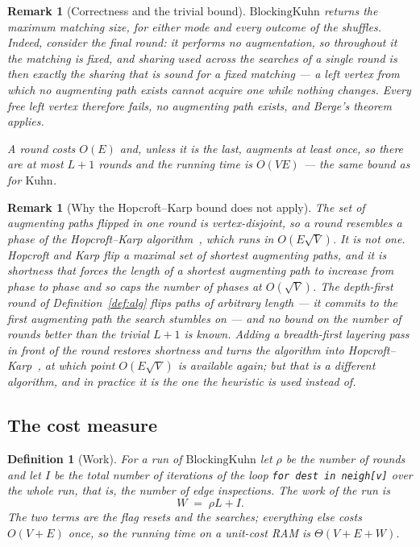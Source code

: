 \documentclass[10pt]{article}
\newtheorem{definition}{Definition}
\newtheorem{remark}[theorem]{Remark}
\newcommand{\Kuhn}{\text{Kuhn}}
\newcommand{\BKuhn}{\text{BlockingKuhn}}
\begin{document}
\begin{remark}[Correctness and the trivial bound]\label{rem:correct}
$\BKuhn$ returns the maximum matching size, for either mode and every outcome
of the shuffles. Indeed, consider the final round: it performs no augmentation,
so throughout it the matching is fixed, and sharing $\mathit{used}$ across the
searches of a single round is then exactly the sharing that is sound for a fixed
matching --- a left vertex from which no augmenting path exists cannot acquire
one while nothing changes. Every free left vertex therefore fails, no augmenting
path exists, and Berge's theorem~\cite{Berge57} applies.

A round costs $O(E)$ and, unless it is the last, augments at least once, so
there are at most $L+1$ rounds and the running time is $O(VE)$ --- the same
bound as for $\Kuhn$.
\end{remark}

\begin{remark}[Why the Hopcroft--Karp bound does not apply]\label{rem:hk}
The set of augmenting paths flipped in one round is vertex-disjoint, so a round
resembles a phase of the Hopcroft--Karp algorithm~\cite{HopcroftKarp73}, which
runs in $O(E\sqrt V)$. It is not one. Hopcroft and Karp flip a maximal set of
\emph{shortest} augmenting paths, and it is shortness that forces the length of
a shortest augmenting path to increase from phase to phase and so caps the
number of phases at $O(\sqrt V)$. The depth-first round of
Definition~\ref{def:alg} flips paths of arbitrary length --- it commits to the
first augmenting path the search stumbles on --- and no bound on the number of
rounds better than the trivial $L+1$ is known. Adding a breadth-first layering
pass in front of the round restores shortness and turns the algorithm into
Hopcroft--Karp~\cite{Adamant23}, at which point $O(E\sqrt V)$ is available
again; but that is a different algorithm, and in practice it is the one the
heuristic is used \emph{instead} of.
\end{remark}

\subsection{The cost measure}

\begin{definition}[Work]\label{def:work}
For a run of $\BKuhn$ let $\rho$ be the number of rounds and let $I$ be the
total number of iterations of the loop \texttt{for dest in neigh[v]} over the
whole run, that is, the number of \emph{edge inspections}. The \emph{work} of
the run is
\[
  W \;=\; \rho L+I .
\]
The two terms are the flag resets and the searches; everything else costs
$O(V+E)$ once, so the running time on a unit-cost RAM is $\Theta(V+E+W)$.
\end{definition}
\end{document}
